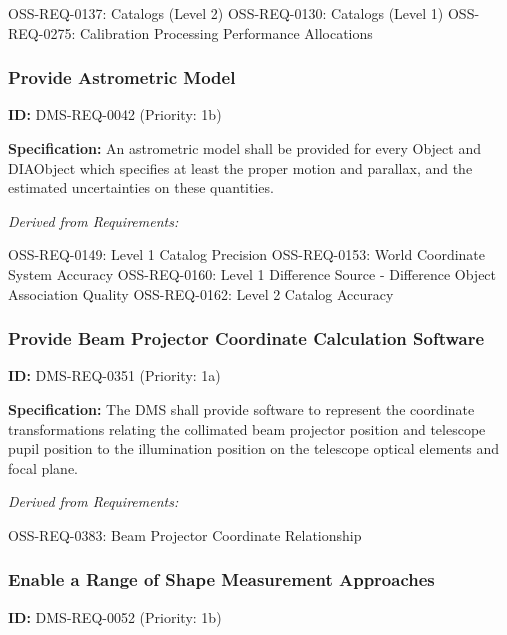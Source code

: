 \documentclass[SE,toc,lsstdraft]{lsstdoc}
\begin{document}
OSS-REQ-0137:
Catalogs (Level 2) \newline
OSS-REQ-0130:
Catalogs (Level 1) \newline
OSS-REQ-0275:
Calibration Processing Performance Allocations \newline

\subsubsection{Provide Astrometric Model}

\label{DMS-REQ-0042}
\textbf{ID:} DMS-REQ-0042 (Priority: 1b)

\textbf{Specification:} An astrometric model shall be provided for every Object and DIAObject which specifies at least the proper motion and parallax, and the estimated uncertainties on these quantities.

\emph{Derived from Requirements:}

OSS-REQ-0149:
Level 1 Catalog Precision \newline
OSS-REQ-0153:
World Coordinate System Accuracy \newline
OSS-REQ-0160:
Level 1 Difference Source - Difference Object Association Quality \newline
OSS-REQ-0162:
Level 2 Catalog Accuracy \newline

\subsubsection{Provide Beam Projector Coordinate Calculation Software}

\label{DMS-REQ-0351}
\textbf{ID:} DMS-REQ-0351 (Priority: 1a)

\textbf{Specification:}  The DMS shall provide software to represent the coordinate transformations relating the collimated beam projector position and telescope pupil position to the illumination position on the telescope optical elements and focal plane.

\emph{Derived from Requirements:}

OSS-REQ-0383:
Beam Projector Coordinate Relationship \newline

\subsubsection{Enable a Range of Shape Measurement Approaches}

\label{DMS-REQ-0052}
\textbf{ID:} DMS-REQ-0052 (Priority: 1b)
\end{document}
